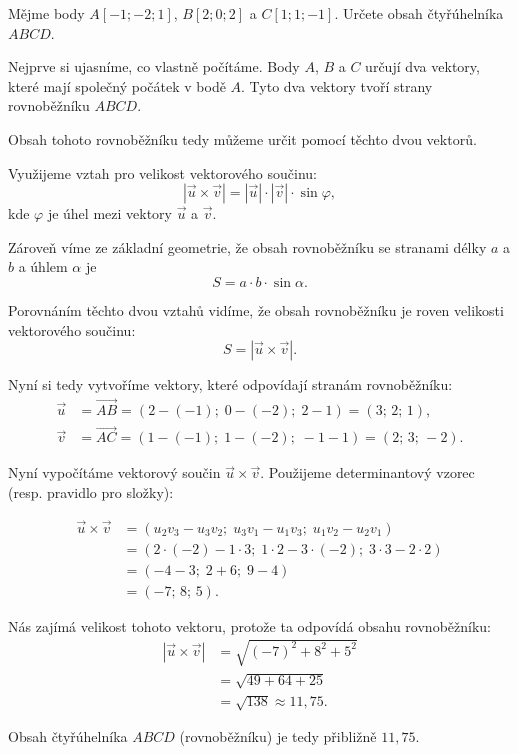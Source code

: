 \begin{example}\label{exa:cross_product_area_parallelogram}
    Mějme body $A[-1; -2; 1]$, $B[2;0;2]$ a $C[1;1;-1]$. Určete obsah čtyřúhelníka $ABCD$.

    Nejprve si ujasníme, co vlastně počítáme. Body $A$, $B$ a $C$ určují dva vektory,
    které mají společný počátek v bodě $A$. Tyto dva vektory tvoří strany rovnoběžníku $ABCD$.

    Obsah tohoto rovnoběžníku tedy můžeme určit pomocí těchto dvou vektorů.

    Využijeme vztah pro velikost vektorového součinu:
    \[
    |\vec{u} \times \vec{v}| = |\vec{u}| \cdot |\vec{v}| \cdot \sin\varphi,
    \]
    kde $\varphi$ je úhel mezi vektory $\vec{u}$ a $\vec{v}$.

    Zároveň víme ze základní geometrie, že obsah rovnoběžníku se stranami délky $a$ a $b$ a úhlem $\alpha$ je
    \[
    S = a \cdot b \cdot \sin\alpha.
    \]

    Porovnáním těchto dvou vztahů vidíme, že obsah rovnoběžníku je roven velikosti vektorového součinu:
    \[
    S = |\vec{u} \times \vec{v}|.
    \]

    Nyní si tedy vytvoříme vektory, které odpovídají stranám rovnoběžníku:
    \begin{align*}
        \vec{u} &= \overrightarrow{AB} = (2 - (-1);\; 0 - (-2);\; 2 - 1) = (3;\, 2;\, 1),\\
        \vec{v} &= \overrightarrow{AC} = (1 - (-1);\; 1 - (-2);\; -1 - 1) = (2;\, 3;\, -2).
    \end{align*}

    Nyní vypočítáme vektorový součin $\vec{u} \times \vec{v}$.
    Použijeme determinantový vzorec (resp. pravidlo pro složky):

    \begin{align*}
        \vec{u} \times \vec{v}  &= (u_2 v_3 - u_3 v_2;\; u_3 v_1 - u_1 v_3;\; u_1 v_2 - u_2 v_1) \\
                                &= (2 \cdot (-2) - 1 \cdot 3;\; 1 \cdot 2 - 3 \cdot (-2);\; 3 \cdot 3 - 2 \cdot 2) \\
                                &= (-4 - 3;\; 2 + 6;\; 9 - 4) \\
                                &= (-7;\, 8;\, 5).
    \end{align*}

    Nás zajímá velikost tohoto vektoru, protože ta odpovídá obsahu rovnoběžníku:
    \begin{align*}
    |\vec{u} \times \vec{v}|    &= \sqrt{(-7)^2 + 8^2 + 5^2} \\
                                &= \sqrt{49 + 64 + 25} \\
                                &= \sqrt{138} \approx 11{,}75.
    \end{align*}

    Obsah čtyřúhelníka $ABCD$ (rovnoběžníku) je tedy přibližně $11{,}75$.
\end{example}


